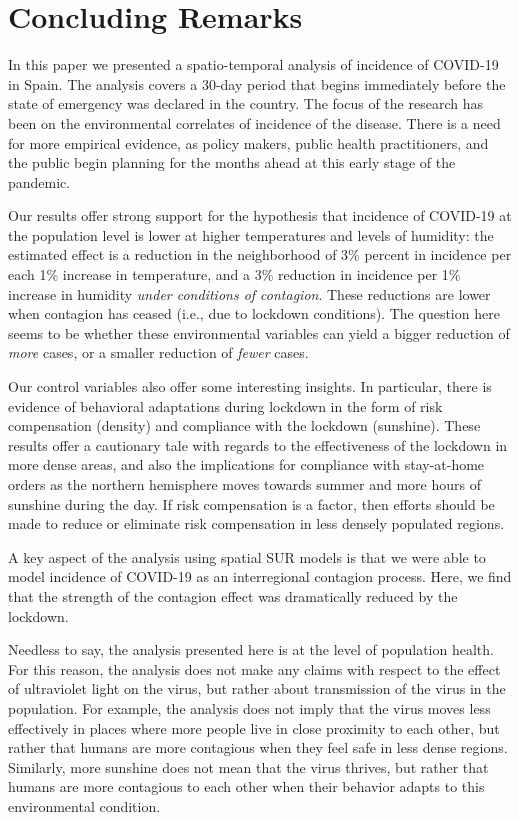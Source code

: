 \documentclass[]{elsarticle} %
\begin{document}
\hypertarget{conclusion}{%
\section{Concluding Remarks}\label{conclusion}}

In this paper we presented a spatio-temporal analysis of incidence of
COVID-19 in Spain. The analysis covers a 30-day period that begins
immediately before the state of emergency was declared in the country.
The focus of the research has been on the environmental correlates of
incidence of the disease. There is a need for more empirical evidence,
as policy makers, public health practitioners, and the public begin
planning for the months ahead at this early stage of the pandemic.

Our results offer strong support for the hypothesis that incidence of
COVID-19 at the population level is lower at higher temperatures and
levels of humidity: the estimated effect is a reduction in the
neighborhood of 3\% percent in incidence per each 1\% increase in
temperature, and a 3\% reduction in incidence per 1\% increase in
humidity \emph{under conditions of contagion}. These reductions are
lower when contagion has ceased (i.e., due to lockdown conditions). The
question here seems to be whether these environmental variables can
yield a bigger reduction of \emph{more} cases, or a smaller reduction of
\emph{fewer} cases.

Our control variables also offer some interesting insights. In
particular, there is evidence of behavioral adaptations during lockdown
in the form of risk compensation (density) and compliance with the
lockdown (sunshine). These results offer a cautionary tale with regards
to the effectiveness of the lockdown in more dense areas, and also the
implications for compliance with stay-at-home orders as the northern
hemisphere moves towards summer and more hours of sunshine during the
day. If risk compensation is a factor, then efforts should be made to
reduce or eliminate risk compensation in less densely populated regions.

A key aspect of the analysis using spatial SUR models is that we were
able to model incidence of COVID-19 as an interregional contagion
process. Here, we find that the strength of the contagion effect was
dramatically reduced by the lockdown.

Needless to say, the analysis presented here is at the level of
population health. For this reason, the analysis does not make any
claims with respect to the effect of ultraviolet light on the virus, but
rather about transmission of the virus in the population. For example,
the analysis does not imply that the virus moves less effectively in
places where more people live in close proximity to each other, but
rather that humans are more contagious when they feel safe in less dense
regions. Similarly, more sunshine does not mean that the virus thrives,
but rather that humans are more contagious to each other when their
behavior adapts to this environmental condition.
\end{document}
